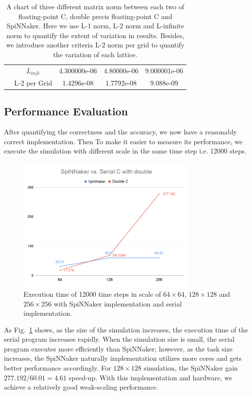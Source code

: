 \begin{table}[tb]
\begin{tabular}{|c|c|c|c|c|}
                     & $L_{infi}$  & 4.300000e-06         & 4.80000e-06           & 9.000001e-06           \\ \cline{2-5} 
                     & L-2 per Grid & 1.4296e-08           & 1.7792e-08            & 9.088e-09              \\ \hline
\end{tabular}
\caption{A chart of three different matrix norm between each two of floating-point C, double precis floating-point C and SpiNNaker. Here we use L-1 norm, L-2 norm and L-infinite norm to quantify the extent of variation in results. Besides, we introduce another criteria L-2 norm per grid to quantify the variation of each lattice.}
\label{table:norm}
\end{table}

\subsection{Performance Evaluation} \label{sec:perfe}
After quantifying the correctness and the accuracy, we now have a reasonably correct implementation. Then To make it easier to measure its performance, we execute the simulation with different scale in the same time step i.e. 12000 steps.\\

\begin{figure}[tb]
   \centering
       \includegraphics[width=0.8\textwidth]{figures/SpiNNaker vs. Serial C with double.png}
       \caption{Execution time of 12000 time steps in scale of $64\times64$, $128\times128$ and $256\times256$ with SpiNNaker implementation and serial implementation.}
       \label{fig:performance}
\end{figure}

As Fig.~\ref{fig:performance} shows, as the size of the simulation increases, the execution time of the serial program increases rapidly. When the simulation size is small, the serial program executes more efficiently than SpiNNaker; however, as the task size increases, the SpiNNaker naturally implementation utilizes more cores and gets better performance accordingly. For $128\times128$ simulation, the SpiNNaker gain $277.192 / 60.01 = 4.61$ speed-up. With this implementation and hardware, we achieve a relatively good weak-scaling performance.\\

